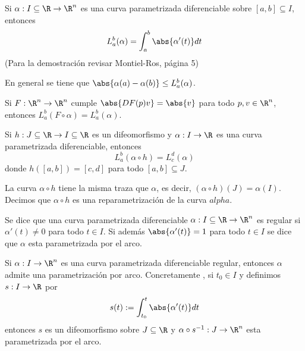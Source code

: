 \documentclass{article}
\begin{document}
\begin{prop}
    Si $\alpha:I\subseteq\R\to\R^{n}$ es una curva parametrizada diferenciable sobre $[a,b]
    \subseteq I$, entonces 
    \begin{equation*}
        L_{a}^{b}(\alpha)=\int_{a}^{b}\abs{\alpha'(t)}dt
    \end{equation*}
    (Para la demostración revisar Montiel-Ros, página 5)
\end{prop}

\begin{cor}
    En general se tiene que $\abs{\alpha(a)-\alpha(b)}\leq L_{a}^{b}(\alpha)$.
\end{cor}

\begin{cor}
    Si $F:\R^{n}\to\R^{n}$ cumple $\abs{DF(p)v}=\abs{v}$ para todo $p,v\in\R^{n}$, entonces
    $L_{a}^{b}(F\circ\alpha)=L_{a}^{b}(\alpha)$.
\end{cor}

\begin{cor}
    Si $h:J\subseteq\R\to I\subseteq\R$ es un difeomorfismo y $\alpha: I\to\R$ es una curva 
    parametrizada diferenciable, entonces
    \begin{equation*}
        L_{a}^{b}(\alpha\circ h)=L_{c}^{d}(\alpha)
    \end{equation*}
    donde $h([a,b])=[c,d]$ para todo $[a,b]\subseteq J$.
\end{cor}

\noindent La curva $\alpha\circ h$ tiene la misma traza que $\alpha$, es decir,
$(\alpha\circ h)(J)=\alpha(I)$. Decimos que $\alpha\circ h$ es una reparametrización 
de la curva $alpha$.

\begin{dfn}
    Se dice que una curva parametrizada diferenciable $\alpha: I\subseteq\R\to\R^{n}$ es regular si
    $\alpha'(t)\neq0$ para todo $t\in I$. Si además $\abs{\alpha'(t)}=1$ para todo $t\in I$ se dice
    que $\alpha$ esta parametrizada por el arco.
\end{dfn}

\begin{teo}
    Si $\alpha: I\to\R^{n}$ es una curva parametrizada diferenciable regular, entonces $\alpha$
    admite una parametrización por arco. Concretamente , si $t_{0}\in I$ y definimos $s: I\to\R$ 
    por
    \begin{equation*}
        s(t):=\int_{t_{0}}^{t}\abs{\alpha'(t)}dt
    \end{equation*}
    entonces $s$ es un difeomorfismo sobre $J\subseteq\R$ y $\alpha\circ s^{-1}:J\to\R^{n}$ esta
    parametrizada por el arco.
\end{teo}
\end{document}
